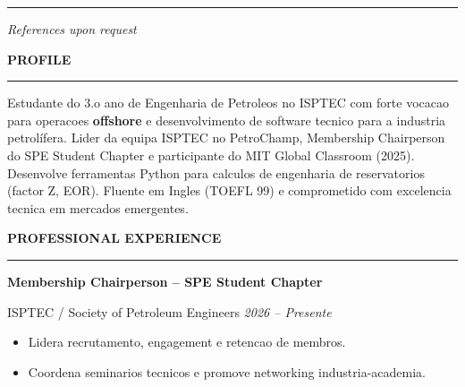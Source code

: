 \documentclass[10pt,a4paper]{article}
\renewcommand{\textbf}[1]{{\bfseries\color{cvgold}#1}}
\newcommand{\mainSection}[1]{%
  \vspace{1pt}%
  {\bfseries\color{cvgold}\large\MakeUppercase{#1}}%
  \par\vspace{0pt}%
  {\color{cvgold}\rule{\linewidth}{0.9pt}}%
  \par\vspace{1pt}%
}
\newcommand{\expEntry}[3]{%
  {\bfseries\color{cvgold}\normalsize #1}\par\vspace{1pt}%
  {\color{cvmuted}\small #2 \hfill \textit{\color{cvgoldlt}#3}}\par\vspace{1pt}%
}
\begin{document}
\begin{minipage}[t]{0.283\paperwidth}
\begin{minipage}[t]{\dimexpr\linewidth-18pt}
    \vspace{2pt}
    \begin{center}
      {\color{cvgold}\rule{0.55\linewidth}{0.4pt}}\par\vspace{2pt}
      {\color{cvgoldlt}\small\itshape References upon request}
    \end{center}

  \end{minipage}
\end{minipage}%
%
\hspace*{10pt}%
\begin{minipage}[t]{\dimexpr 0.705\paperwidth - 26pt}
  \color{cvwhite}
  \setlength{\parskip}{1pt}

  \vspace{5pt}


  \mainSection{Profile}
  Estudante do 3.o ano de Engenharia de Petroleos no ISPTEC com forte vocacao para
  operacoes \textbf{offshore} e desenvolvimento de software tecnico para a industria
  petrolífera. Lider da equipa ISPTEC no PetroChamp, Membership Chairperson do SPE
  Student Chapter e participante do MIT Global Classroom (2025). Desenvolve ferramentas
  Python para calculos de engenharia de reservatorios (factor Z, EOR). Fluente em
  Ingles (TOEFL 99) e comprometido com excelencia tecnica em mercados emergentes.

  \mainSection{Professional Experience}

  \expEntry{Membership Chairperson -- SPE Student Chapter}%
           {ISPTEC / Society of Petroleum Engineers}%
           {2026 -- Presente}
  \begin{itemize}
    \item Lidera recrutamento, engagement e retencao de membros.
    \item Coordena seminarios tecnicos e promove networking industria-academia.
  \end{itemize}


\end{minipage}
\end{document}
